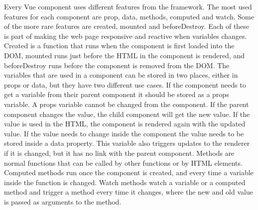 Every Vue component uses different features from the framework. The most used features for each component are prop, data, methods, computed and watch. Some of the more rare features are created, mounted and beforeDestroy. Each of these is part of making the web page responsive and reactive when variables changes. Created is a function that runs when the component is first loaded into the DOM, mounted runs just before the HTML in the component is rendered, and beforeDestroy runs before the component is removed from the DOM. The variables that are used in a component can be stored in two places, either in props or data, but they have two different use cases. If the component needs to get a variable from their parent component it should be stored as a props variable. A props variable cannot be changed from the component. If the parent component changes the value, the child component will get the new value. If the value is used in the HTML, the component is rendered again with the updated value. If the value needs to change inside the component the value needs to be stored inside a data property. This variable also triggers updates to the renderer if it is changed, but it has no link with the parent component. Methods are normal functions that can be called by other functions or by HTML elements. Computed methods run once the component is created, and every time a variable inside the function is changed. Watch methods watch a variable or a computed method and trigger a method every time it changes, where the new and old value is passed as arguments to the method.
